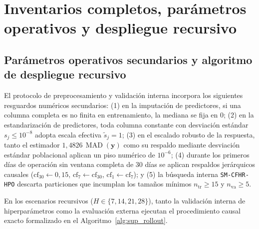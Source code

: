 \documentclass[11pt,a4paper]{article}
\DeclareMathOperator{\MAD}{MAD}
\newcounter{algoritmo}
\begin{document}
\section{Inventarios completos, parámetros operativos y despliegue recursivo}\label{sup:tablas}



\subsection{Parámetros operativos secundarios y algoritmo de despliegue recursivo}\label{sup:operativos}

El protocolo de preprocesamiento y validación interna incorpora los siguientes resguardos numéricos secundarios: (1) en la imputación de predictores, si una columna completa es no finita en entrenamiento, la mediana se fija en $0$; (2) en la estandarización de predictores, toda columna constante con desviación estándar $s_j \le 10^{-8}$ adopta escala efectiva $\tilde{s}_j = 1$; (3) en el escalado robusto de la respuesta, tanto el estimador $1{,}4826\,\MAD(\mathbf{y})$ como su respaldo mediante desviación estándar poblacional aplican un piso numérico de $10^{-6}$; (4) durante los primeros días de operación sin ventana completa de $30$ días se aplican respaldos jerárquicos causales ($\mathrm{cf}_{30} \leftarrow 0{,}15$, $\mathrm{cf}_7 \leftarrow \mathrm{cf}_{30}$, $\mathrm{cf}_1 \leftarrow \mathrm{cf}_7$); y (5) la búsqueda interna \texttt{SM-CFHR-HPO} descarta particiones que incumplan los tamaños mínimos $n_{\mathrm{tr}} \ge 15$ y $n_{\mathrm{va}} \ge 5$.

En los escenarios recursivos ($H \in \{7,14,21,28\}$), tanto la validación interna de hiperparámetros como la evaluación externa ejecutan el procedimiento causal exacto formalizado en el Algoritmo~\ref{alg:sup_rollout}.
\end{document}
